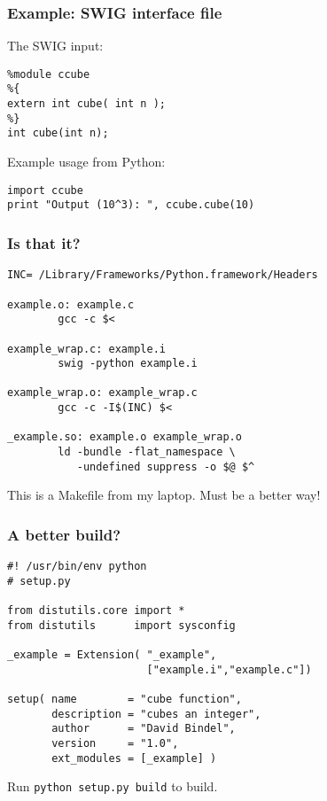 \documentclass{beamer}
\begin{document}
\begin{frame}[fragile]
  \frametitle{Example: SWIG interface file}

The SWIG input:
\begin{lstlisting}
%module ccube
%{
extern int cube( int n );
%}
int cube(int n);
\end{lstlisting}

\vspace{5mm}
Example usage from Python:
\begin{lstlisting}
import ccube
print "Output (10^3): ", ccube.cube(10)
\end{lstlisting}
\end{frame}


\begin{frame}[fragile]
  \frametitle{Is that it?}

{\small
\begin{lstlisting}
INC= /Library/Frameworks/Python.framework/Headers

example.o: example.c
        gcc -c $<

example_wrap.c: example.i
        swig -python example.i

example_wrap.o: example_wrap.c
        gcc -c -I$(INC) $<

_example.so: example.o example_wrap.o
        ld -bundle -flat_namespace \
           -undefined suppress -o $@ $^
\end{lstlisting}}
This is a Makefile from my laptop.  Must be a better way!

\end{frame}

\begin{frame}[fragile]
  \frametitle{A better build?}

\begin{lstlisting}
#! /usr/bin/env python
# setup.py

from distutils.core import *
from distutils      import sysconfig

_example = Extension( "_example",
                      ["example.i","example.c"])

setup( name        = "cube function",
       description = "cubes an integer",
       author      = "David Bindel",
       version     = "1.0",
       ext_modules = [_example] )
\end{lstlisting}
Run {\tt python setup.py build} to build.

\end{frame}
\end{document}
